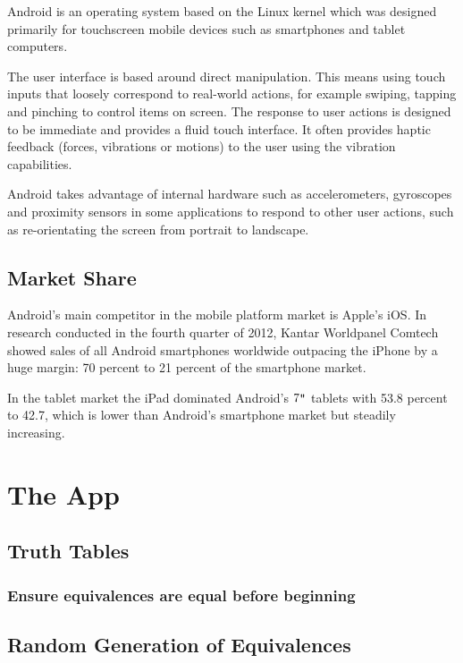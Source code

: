 \documentclass{report}
\begin{document}
Android is an operating system based on the Linux kernel which was designed primarily for touchscreen mobile devices such as smartphones and tablet computers\cite{androidwiki}.

The user interface is based around direct manipulation. This means using touch inputs that loosely correspond to real-world actions, for example swiping, tapping and pinching to control items on screen. The response to user actions is designed to be immediate and provides a fluid touch interface. It often provides haptic feedback (forces, vibrations or motions) to the user using the vibration capabilities.

Android takes advantage of internal hardware such as accelerometers, gyroscopes and proximity sensors in some applications to respond to other user actions, such as re-orientating the screen from portrait to landscape.

\section{Market Share}

Android's main competitor in the mobile platform market is Apple's iOS. In research conducted in the fourth quarter of 2012, Kantar Worldpanel Comtech showed sales of all Android smartphones worldwide outpacing the iPhone by a huge margin: 70 percent to 21 percent of the smartphone market\cite{androidstats}.

In the tablet market the iPad dominated Android's $7\verb+"+$ tablets with 53.8 percent to 42.7, which is lower than Android's smartphone market but steadily increasing.

\chapter{The App}
\section{Truth Tables}
\label{sec:app_truth_tables}

\subsection{Ensure equivalences are equal before beginning}

\section{Random Generation of Equivalences}
\end{document}

